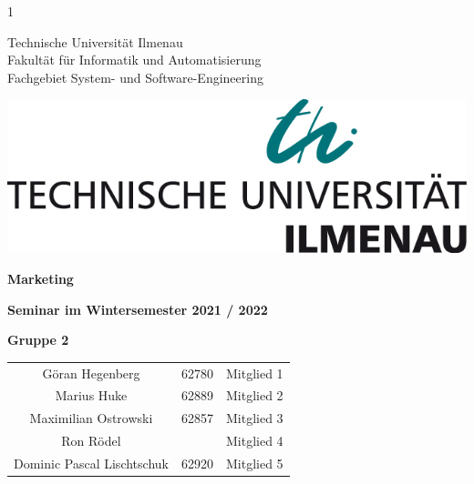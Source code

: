 1\begin{titlepage}
    
    \begin{minipage}[b]{0.625\textwidth}
      Technische Universität Ilmenau\\
      Fakultät für Informatik und Automatisierung\\
      Fachgebiet System- und Software-Engineering
    \end{minipage}%
    \hfill
    \begin{minipage}[b]{0.375\textwidth}
      \begin{flushright}
        \includegraphics[width=\textwidth]{tu_logo.jpg}
      \end{flushright}
    \end{minipage}
    \vspace*{12\baselineskip}
    
    \begin{centering}
    {\huge \textbf{Marketing}}\\
    \vspace*{1\baselineskip}
    
    {\large \textbf{Seminar im Wintersemester 2021 / 2022}}\\
    \vspace*{9\baselineskip}
    
    {\LARGE \textbf{Gruppe 2}}\\
    \vspace*{1\baselineskip}
    
    \begin{center}
        \large
        \begin{tabular}{ccc}
            Göran Hegenberg & 62780 & Mitglied 1 \\
            Marius Huke & 62889 & Mitglied 2 \\
            Maximilian Ostrowski & 62857 & Mitglied 3 \\
            Ron Rödel & & Mitglied 4 \\
            Dominic Pascal Lischtschuk & 62920 & Mitglied 5 \\
        \end{tabular}
    \end{center}
    \end{centering}
    
    \restoregeometry
    \end{titlepage}
    
    
    
    \tableofcontents
    \thispagestyle{empty} %
    \pagebreak %